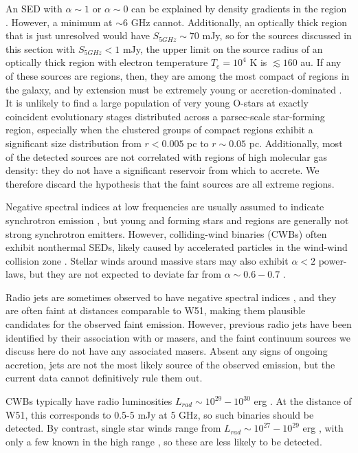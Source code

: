 An SED with $\alpha\sim1$ or $\alpha\sim0$ can be explained by density
gradients in the \hii region \citep{Keto2008a,Galvan-Madrid2009a,Tanaka2016a}.
However, a minimum at $\sim6$ GHz cannot.  Additionally, an optically thick
\hii region that is just unresolved would have $S_{5 GHz} \sim 70$ mJy, so for
the sources discussed in this section with $S_{5 GHz} < 1$ mJy, the upper limit
on the source radius of an optically thick \hii region with electron
temperature $T_e=10^4$ K is $\lesssim160$ au.  If any of these sources are \hii
regions, then, they are among the most compact of \hchii regions in the galaxy,
and by extension must be extremely young or accretion-dominated
\citep{Keto2003a,Peters2010b}.  It is unlikely to find a large
population of very young O-stars at exactly coincident evolutionary stages
distributed across a parsec-scale star-forming region, especially when the clustered
groups of compact \hii regions exhibit a significant size distribution from
$r<0.005$ pc to $r\sim0.05$ pc.  Additionally, most of the detected sources
are not correlated with regions of high molecular gas density: they do not
have a significant reservoir from which to accrete.  We therefore discard the
hypothesis that the faint sources are all extreme \hchii regions.

Negative spectral indices at low frequencies are usually assumed to indicate
synchrotron emission \citep{Wilson2009a,Condon2007a}, but young and forming
stars and \hii regions are generally not strong synchrotron emitters.  However,
colliding-wind binaries (CWBs) often exhibit nonthermal SEDs, likely caused by
accelerated particles in the wind-wind collision zone \citep{De-Becker2013a}.
Stellar winds around massive stars may also exhibit $\alpha<2$ power-laws, but
they are not expected to deviate far from $\alpha\sim0.6-0.7$
\citep{Wright1975a,Panagia1975b,Reynolds1986a}.

Radio jets are sometimes observed to have negative spectral indices
\citep{Moscadelli2013a,Moscadelli2016a}, and they are often faint at distances
comparable to W51, making them plausible candidates for the observed faint
emission.  However, previous radio jets have been identified by their
association with \methanol or \water masers, and the faint continuum sources we
discuss here do not have any associated masers.  Absent any signs of ongoing
accretion, jets are not the most likely source of the observed emission, but
the current data cannot definitively rule them out.

CWBs typically have radio luminosities
$L_{rad}\sim10^{29}-10^{30}$ erg \pers \citep{De-Becker2013a}.   At the
distance of W51, this corresponds to 0.5-5 mJy at 5 GHz, so such binaries
should be detected.  By contrast, single star winds range from $L_{rad} \sim
10^{27}-10^{29}$ erg \pers, with only a few known in the high range
\citep{Bieging1989a}, so these are less likely to be detected.

